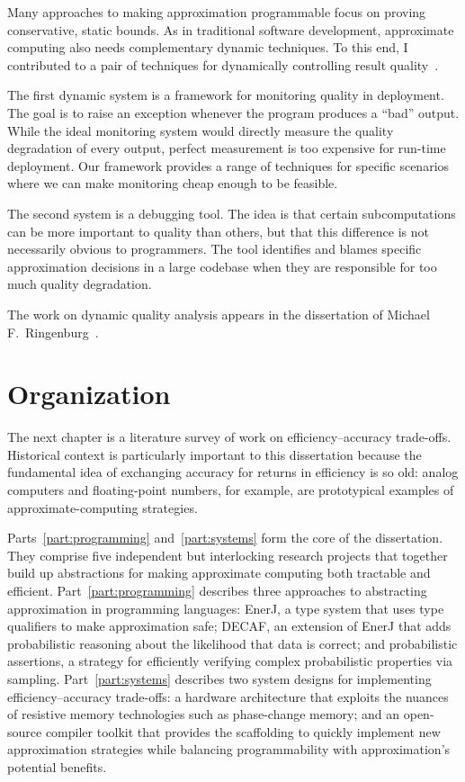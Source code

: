 Many approaches to making approximation programmable focus on proving
conservative, static bounds.
As in traditional software development,
approximate computing also needs complementary dynamic techniques.
To this end, I contributed to a pair of techniques for dynamically controlling
result quality~\cite{approxdebug}.

The first dynamic system is a framework for monitoring quality in deployment.
The goal is to raise an exception whenever the program produces a ``bad''
output.
While the ideal monitoring system would directly measure the quality
degradation of every output,
perfect measurement is too expensive for run-time deployment.
Our framework provides a range of techniques for specific scenarios where we
can make monitoring cheap enough to be feasible.

The second system is a debugging tool.
The idea is that certain subcomputations can be more important to
quality than others, but that this difference is not necessarily obvious to
programmers.
The tool identifies and blames specific approximation decisions in a large
codebase when they are responsible for too much quality degradation.

The work on dynamic quality analysis appears in the dissertation of
Michael F.\ Ringenburg~\cite{ringenburg-thesis}.


\section{Organization}

The next chapter is a literature survey of work on efficiency--accuracy
trade-offs.
Historical context is particularly important to this dissertation because the
fundamental idea of exchanging accuracy for returns in efficiency is so old:
analog computers and floating-point numbers, for example, are prototypical
examples of
approximate-computing strategies.

Parts~\ref{part:programming} and~\ref{part:systems} form the core of the
dissertation.
They comprise five independent but interlocking research projects that
together build up abstractions for making approximate computing both tractable
and efficient.
%
Part~\ref{part:programming} describes three approaches to abstracting
approximation in programming languages:
EnerJ, a type system that uses type qualifiers to make approximation safe;
DECAF, an extension of EnerJ that adds probabilistic reasoning
about the likelihood that data is correct;
and probabilistic assertions, a strategy for efficiently verifying complex
probabilistic properties via sampling.
%
Part~\ref{part:systems} describes two system designs for implementing
efficiency--accuracy trade-offs:
a hardware architecture that exploits the nuances of resistive memory
technologies such as phase-change memory;
and an open-source compiler toolkit that provides the scaffolding to quickly
implement new approximation strategies while balancing programmability with
approximation's potential benefits.

